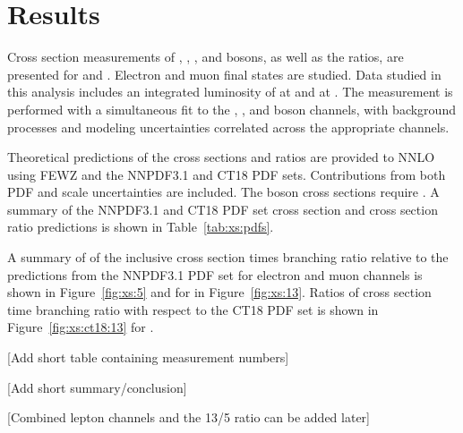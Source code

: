 \chapter{Results}\label{ch:results}
Cross section measurements of \Wp, \Wm, \W, and \Z bosons, as well as the ratios, are presented for \sg and \sh. Electron and muon final states are studied. Data studied in this analysis includes an integrated luminosity of \lumig at \sg and \lumih at \sh. The measurement is performed with a simultaneous fit to the \Wp, \Wm, and \Z boson channels, with background processes and modeling uncertainties correlated across the appropriate channels. 

Theoretical predictions of the cross sections and ratios are provided to NNLO using FEWZ and the NNPDF3.1 and CT18 PDF sets. Contributions from both PDF and scale uncertainties are included. The \Z boson cross sections require \masswindow. A summary of the NNPDF3.1 and CT18 PDF set cross section and cross section ratio predictions is shown in Table~\ref{tab:xs:pdfs}.



A summary of of the inclusive cross section times branching ratio relative to the predictions from the NNPDF3.1 PDF set for \sg electron and muon channels is shown in Figure~\ref{fig:xs:5} and for \sh in Figure~\ref{fig:xs:13}. Ratios of cross section time branching ratio with respect to the CT18 PDF set is shown in Figure~\ref{fig:xs:ct18:13} for \sh.




[Add short table containing measurement numbers]


[Add short summary/conclusion]

[Combined lepton channels and the 13/5 ratio can be added later]
%

% 
% 





